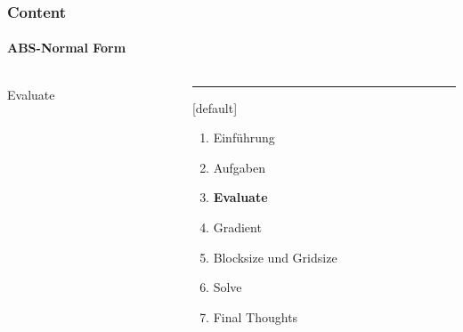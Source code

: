 \begin{frame}
	\frametitle{Content}
	\framesubtitle{ABS-Normal Form}
	\begin{columns}[T] %
		\begin{column}{.48\textwidth}
			
			\begin{center}
				{\Huge Evaluate}
			\end{center}
			
		\end{column}%
		\hfill%
		\begin{column}{.48\textwidth}
			\color{blue}\rule{\linewidth}{4pt}
			
			\begin{enumerate}
				\item Einführung
				\item Aufgaben
				\item \textbf{Evaluate}
				\item Gradient
				\item Blocksize und Gridsize
				\item Solve
				\item Final Thoughts
			\end{enumerate}
		\end{column}%
	\end{columns}
\end{frame}
